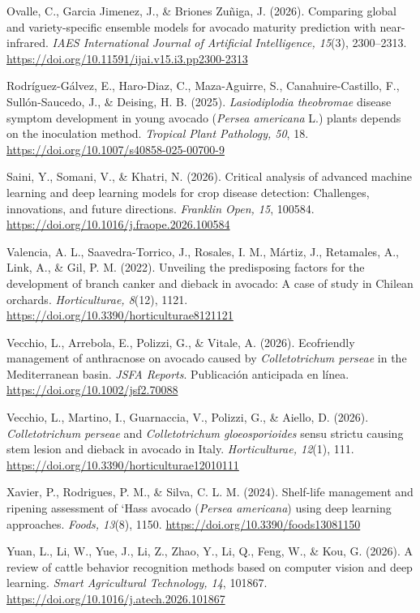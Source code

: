 \documentclass[11pt]{article}
\begin{document}
\begin{list}{}{\leftmargin=1.27cm \itemindent=-1.27cm \itemsep=4pt \parsep=0pt}
\item Ovalle, C., Garcia Jimenez, J., \& Briones Zuñiga, J. (2026). Comparing global and variety-specific ensemble models for avocado maturity prediction with near-infrared. \textit{IAES International Journal of Artificial Intelligence, 15}(3), 2300–2313. \url{https://doi.org/10.11591/ijai.v15.i3.pp2300-2313}
\item Rodríguez-Gálvez, E., Haro-Diaz, C., Maza-Aguirre, S., Canahuire-Castillo, F., Sullón-Saucedo, J., \& Deising, H. B. (2025). \textit{Lasiodiplodia theobromae} disease symptom development in young avocado (\textit{Persea americana} L.) plants depends on the inoculation method. \textit{Tropical Plant Pathology, 50}, 18. \url{https://doi.org/10.1007/s40858-025-00700-9}
\item Saini, Y., Somani, V., \& Khatri, N. (2026). Critical analysis of advanced machine learning and deep learning models for crop disease detection: Challenges, innovations, and future directions. \textit{Franklin Open, 15}, 100584. \url{https://doi.org/10.1016/j.fraope.2026.100584}
\item Valencia, A. L., Saavedra-Torrico, J., Rosales, I. M., Mártiz, J., Retamales, A., Link, A., \& Gil, P. M. (2022). Unveiling the predisposing factors for the development of branch canker and dieback in avocado: A case of study in Chilean orchards. \textit{Horticulturae, 8}(12), 1121. \url{https://doi.org/10.3390/horticulturae8121121}
\item Vecchio, L., Arrebola, E., Polizzi, G., \& Vitale, A. (2026). Ecofriendly management of anthracnose on avocado caused by \textit{Colletotrichum perseae} in the Mediterranean basin. \textit{JSFA Reports}. Publicación anticipada en línea. \url{https://doi.org/10.1002/jsf2.70088}
\item Vecchio, L., Martino, I., Guarnaccia, V., Polizzi, G., \& Aiello, D. (2026). \textit{Colletotrichum perseae} and \textit{Colletotrichum gloeosporioides} sensu strictu causing stem lesion and dieback in avocado in Italy. \textit{Horticulturae, 12}(1), 111. \url{https://doi.org/10.3390/horticulturae12010111}
\item Xavier, P., Rodrigues, P. M., \& Silva, C. L. M. (2024). Shelf-life management and ripening assessment of `Hass\textquotesingle{} avocado (\textit{Persea americana}) using deep learning approaches. \textit{Foods, 13}(8), 1150. \url{https://doi.org/10.3390/foods13081150}
\item Yuan, L., Li, W., Yue, J., Li, Z., Zhao, Y., Li, Q., Feng, W., \& Kou, G. (2026). A review of cattle behavior recognition methods based on computer vision and deep learning. \textit{Smart Agricultural Technology, 14}, 101867. \url{https://doi.org/10.1016/j.atech.2026.101867}
\end{list}
\end{document}
